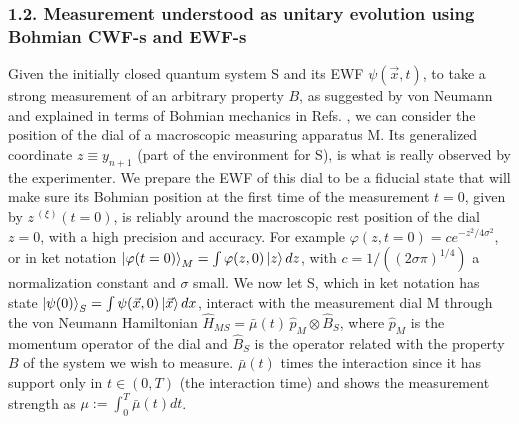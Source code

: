 \documentclass[11pt, a4paper]{article} %
\begin{document}
\vspace{-0.2cm}

\subsubsection*{1.2. Measurement understood as unitary evolution using Bohmian CWF-s and EWF-s}
\vspace{-0.1cm}
Given the initially closed quantum system S and its EWF $\psi(\vec{x},t)$, to take a strong measurement of an arbitrary property $B$, as suggested by von Neumann \cite{vonNeumann} and explained in terms of Bohmian mechanics in Refs. \cite{Durr, JordiXavier, Holland}, we can consider the position of the dial of a macroscopic measuring apparatus M. Its generalized coordinate $z\equiv y_{n+1}$ (part of the environment for S), is what is really observed by the experimenter. We prepare the EWF of this dial to be a fiducial state that will make sure its Bohmian position at the first time of the measurement $t=0$, given by $z^{\:(\xi)}(t=0)$, is reliably around the macroscopic rest position of the dial $z=0$, with a high precision and accuracy. For example $\varphi(z,t=0)=c e^{-z^2/4\sigma^2}$, or in ket notation $\ket{\varphi(t=0)}_M=\int\varphi(z,0) \ket{z}dz$,  with $c=1/((2\sigma\pi)^{1/4})$ a normalization constant and $\sigma$ small. We now let S, which in ket notation has state $\ket{\psi(0)}_S=\int\psi(\vec{x},0)\ket{\vec{x}}dx$, interact with the measurement dial M through the von Neumann Hamiltonian $\hat{H}_{MS}=\bar{\mu}(t)\,\hat{p}_M\otimes \hat{B}_S$, where $\hat{p}_M$ is the momentum operator of the dial and $\hat{B}_S$ is the operator related with the property $B$ of the system we wish to measure. $\bar{\mu}(t)$ times the interaction since it has support only in $t\in(0,T)$ (the interaction time) and shows the measurement strength as $\mu:=\int_0^T\bar{\mu}(t)dt$. 
\end{document}
